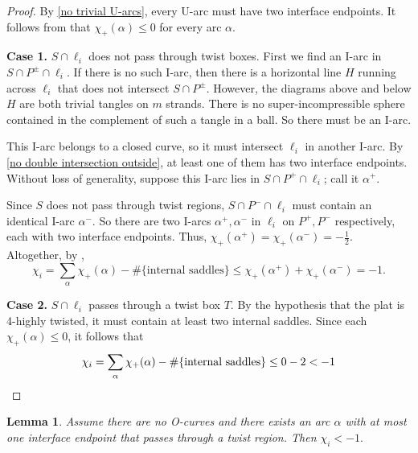 \documentclass[12pt,reqno]{amsart}
\theoremstyle{plain}
\newtheorem{lemma}[theorem]{Lemma}
\theoremstyle{definition}
\begin{document}
\begin{proof}
By \ref{no trivial U-arcs}, every U-arc must have two interface endpoints. 
It follows from  that $\chi_+(\alpha)\leq 0$ for every 
arc $\alpha$. 

\textbf{Case 1.} $S\cap \ell_i$ does not pass through twist boxes. 
First we find an I-arc in $S\cap P^\pm \cap \ell_i$. 
If there is no such I-arc, then there is a horizontal line $H$ running across 
$\ell_i$ that does not intersect $S\cap P^{\pm}$. However, the diagrams above and 
below $H$ are both trivial tangles on $m$ strands. There is no super-incompressible 
sphere contained in the complement of such a tangle in a ball. So there must be an I-arc. 
    
This I-arc belongs to a closed curve, so it must intersect $\ell_i$ in another I-arc. 
By \ref{no double intersection outside}, at least one of them has two interface endpoints. 
Without loss of generality, suppose this I-arc lies in $S\cap P^+\cap \ell_i$; 
call it $\alpha^+$. 

Since $S$ does not pass through twist regions, $S\cap P^-\cap \ell_i$ must contain an 
identical I-arc $\alpha^-$. So there are two I-arcs $\alpha^+,\alpha^-$ in $\ell_i$ on 
$P^+,P^-$ respectively, each with two interface endpoints. Thus, 
$\chi_+(\alpha^+)=\chi_+(\alpha^-)=-\tfrac12$.
Altogether, by , 
\[ \chi_i = \sum_\alpha \chi_+(\alpha) - \#\{\text{internal saddles}\} \le 
    \chi_+(\alpha^+)+\chi_+(\alpha^-)= -1. \]

\textbf{Case 2.} $S\cap \ell_i$ passes through a twist box $T$. 
By the hypothesis that the plat is 4-highly twisted, it must contain at least two 
internal saddles. Since each $\chi_+(\alpha)\leq 0$, it follows that
\[ \chi_i =\sum_\alpha \chi_+(\alpha) - \#\{\text{internal saddles}\} \le 0 - 2 <-1 \qedhere \]
\end{proof}

\begin{lemma}\label{lem:arc one interface twregion neg chi}
Assume there are no O-curves and there exists an arc $\alpha$ with at most one 
interface endpoint that passes through a twist region. Then $\chi_i<-1.$
\end{lemma}
\end{document}
